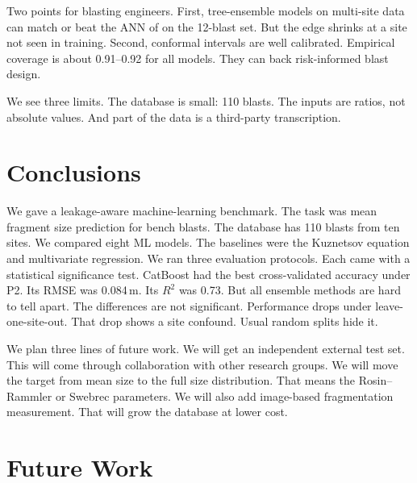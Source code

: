 \documentclass[conference]{IEEEtran}
\begin{document}
Two points for blasting engineers. First, tree-ensemble models on multi-site data can match or beat the ANN of \cite{kulatilake2010} on the 12-blast set. But the edge shrinks at a site not seen in training. Second, conformal intervals are well calibrated. Empirical coverage is about 0.91--0.92 for all models. They can back risk-informed blast design.

We see three limits. The database is small: 110 blasts. The inputs are ratios, not absolute values. And part of the data is a third-party transcription.










\section{Conclusions}
We gave a leakage-aware machine-learning benchmark. The task was mean fragment size prediction for bench blasts. The database has 110 blasts from ten sites. We compared eight ML models. The baselines were the Kuznetsov equation and multivariate regression. We ran three evaluation protocols. Each came with a statistical significance test. CatBoost had the best cross-validated accuracy under P2. Its RMSE was 0.084\,m. Its $R^2$ was 0.73. But all ensemble methods are hard to tell apart. The differences are not significant. Performance drops under leave-one-site-out. That drop shows a site confound. Usual random splits hide it.

We plan three lines of future work. We will get an independent external test set. This will come through collaboration with other research groups. We will move the target from mean size to the full size distribution. That means the Rosin--Rammler or Swebrec parameters. We will also add image-based fragmentation measurement. That will grow the database at lower cost.















\section{Future Work}
\end{document}
